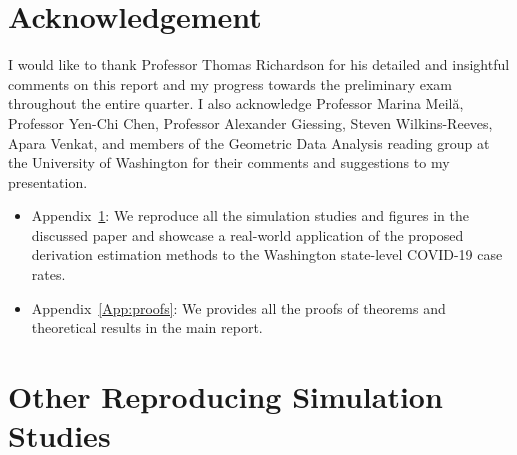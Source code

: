 \documentclass{uwstat572}
\theoremstyle{definition}
\theoremstyle{theorem}
\begin{document}
\pagebreak

\section*{Acknowledgement}

I would like to thank Professor Thomas Richardson for his detailed and insightful comments on this report and my progress towards the preliminary exam throughout the entire quarter. I also acknowledge Professor Marina Meil\u{a}, Professor Yen-Chi Chen, Professor Alexander Giessing, Steven Wilkins-Reeves, Apara Venkat, and members of the Geometric Data Analysis reading group at the University of Washington for their comments and suggestions to my presentation.



\appendix

\vspace{10mm}

\begin{itemize}
	\item Appendix~\ref{App:repro}: We reproduce all the simulation studies and figures in the discussed paper \citep{liu2020smoothed} and showcase a real-world application of the proposed derivation estimation methods to the Washington state-level COVID-19 case rates.
	
	\item Appendix~\ref{App:proofs}: We provides all the proofs of theorems and theoretical results in the main report.
\end{itemize}


\section{Other Reproducing Simulation Studies}
\label{App:repro}
\end{document}
